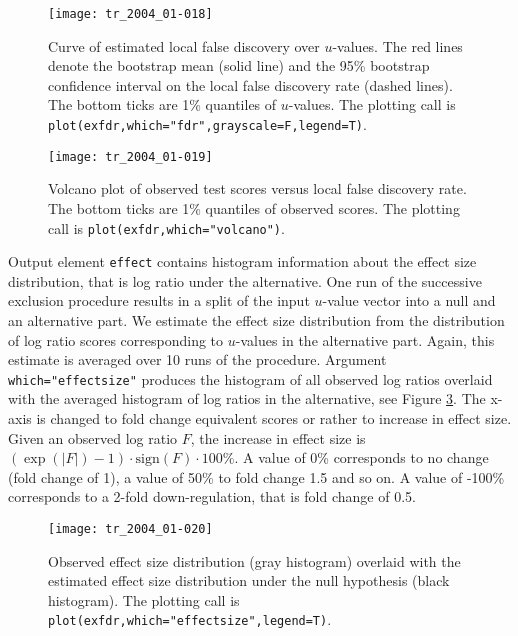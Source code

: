 \documentclass[11pt,a4paper,fleqn]{report}
\newcommand{\Robject}[1]{{\texttt{#1}}}
\newcommand{\Rfunarg}[1]{{\texttt{#1}}}
\begin{document}
\begin{figure}[t]
\begin{center}
\texttt{[image: tr\_2004\_01-018]}
\caption{Curve of estimated local false discovery over $u$-values. The red lines denote the bootstrap mean (solid line) and the 95\% bootstrap confidence interval on the local false discovery rate (dashed lines). The bottom ticks are 1\% quantiles of $u$-values. The plotting call is  \texttt{plot(exfdr,which="fdr",grayscale=F,legend=T)}.}\label{fig_fdr}
\end{center}
\end{figure}


\begin{figure}[t]
\begin{center}
\texttt{[image: tr\_2004\_01-019]}
\caption{Volcano plot of observed test scores versus local false discovery rate. The bottom ticks are 1\% quantiles of observed scores. The plotting call is \texttt{plot(exfdr,which="volcano")}.}\label{fig_volcano}
\end{center}
\end{figure}

Output element \Robject{effect} contains histogram information about the effect size distribution, that is log ratio under the alternative. One run of the successive exclusion procedure results in a split of the input $u$-value vector into a null and an alternative part. We estimate the effect size distribution from the distribution of log ratio scores corresponding to $u$-values in the alternative part. Again, this estimate is averaged over 10 runs of the procedure. Argument \Rfunarg{which="effectsize"} produces the histogram of all observed log ratios overlaid with the averaged histogram of log ratios in the alternative, see Figure \ref{fig_effectsize}. The x-axis is changed to fold change equivalent scores or rather to increase in effect size. Given an observed log ratio $F$, the increase in effect size is $(\exp (|F|)-1) \cdot \mbox{sign} (F) \cdot 100\%$. A value of 0\% corresponds to no change (fold change of 1), a value of 50\% to fold change 1.5 and so on. A value of -100\% corresponds to a 2-fold down-regulation, that is fold change of 0.5.

\begin{figure}[t]
\begin{center}
\texttt{[image: tr\_2004\_01-020]}
\caption{Observed effect size distribution (gray histogram) overlaid with the estimated effect size distribution under the null hypothesis (black histogram). The plotting call is \texttt{plot(exfdr,which="effectsize",legend=T)}.}\label{fig_effectsize}
\end{center}
\end{figure}
\end{document}
